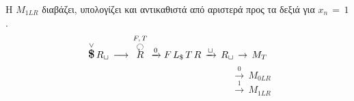 \par Η $M_{1LR}$ διαβάζει, υπολογίζει και αντικαθιστά από αριστερά προς τα δεξιά για $x_n\,=\,1$.
\reducevspace\reducevspace\reducevspace\reducevspace\reducevspace\reducevspace\reducevspace\reducevspace\reducevspace
\reducevspace\reducevspace\reducevspace\reducevspace\reducevspace\reducevspace\reducevspace\reducevspace\reducevspace
\[\overset{\lor}{{\text{\large\bfseries \$}}}\,R_\sqcup\, \longrightarrow\,
\overset{F,\,T}{\overset{\botcircleleft}{R}}\, \xrightarrow{0} F\, L_\$\, T\, R\, \xrightarrow{\sqcup}\, R_\sqcup\,
\rightarrow\, M_T \]
\reducevspace\reducevspace\reducevspace\reducevspace\reducevspace\reducevspace\reducevspace
\reducevspace\reducevspace\reducevspace\reducevspace\reducevspace\reducevspace\reducevspace
\reducevspace\reducevspace\reducevspace\reducevspace\reducevspace\reducevspace\reducevspace
\reducevspace\reducevspace\reducevspace\reducevspace\reducevspace\reducevspace\reducevspace
\[\qquad\qquad\qquad\qquad\qquad\qquad\qquad\quad\;\, \xrightarrow{0}\, M_{0LR}\]
\reducevspace\reducevspace\reducevspace\reducevspace\reducevspace\reducevspace\reducevspace
\reducevspace\reducevspace\reducevspace\reducevspace\reducevspace\reducevspace\reducevspace
\reducevspace\reducevspace\reducevspace\reducevspace\reducevspace\reducevspace\reducevspace
\reducevspace\reducevspace\reducevspace\reducevspace\reducevspace\reducevspace\reducevspace
\[\qquad\qquad\qquad\qquad\qquad\qquad\qquad\quad\;\, \xrightarrow{1}\, M_{1LR}\]

